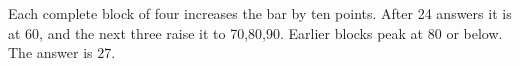 Each complete block of four increases the bar by ten points. After 24 answers it is at 60, and the next three raise it to 70,80,90. Earlier blocks peak at 80 or below. The answer is $\boxed{27}$.
